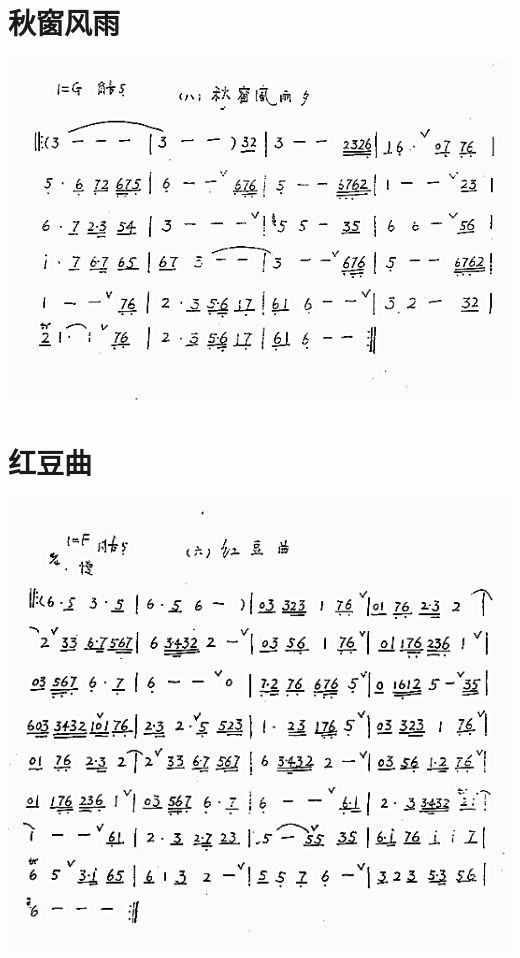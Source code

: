 \documentclass[cn,pad,chinese,chinesefont=nofont]{elegantbook}
\begin{document}
\section{秋窗风雨}
    \includegraphics[width=\textwidth]{dongxiao/秋窗风雨.jpg}
\section{红豆曲}
    \includegraphics[width=\textwidth]{dongxiao/红豆曲.jpg}
\end{document}
